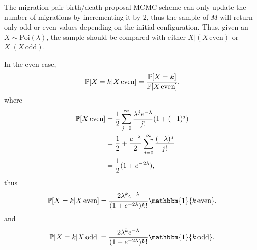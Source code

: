 The migration pair birth/death proposal MCMC scheme can only update the number of migrations by incrementing it by 2, thus the sample of $M$ will return only odd or even values depending on the initial configuration. Thus, given an $X \sim \text{Poi}(\lambda)$, the sample should be compared with either $X | (X \, \text{even})$ or $X | (X \, \text{odd} )$.

In the even case,
\[
\mathbb{P} [X = k | X \, \text{even}] = \frac{\mathbb{P}[X = k]}{\mathbb{P}[X \, \text{even}]},
\]
where
\begin{align*}
	\mathbb{P}[X \, \text{even}] & = \frac{1}{2} \sum_{j=0}^\infty \frac{\lambda^{j} e^{-\lambda}}{j!} (1 + (-1)^j) \\
	& = \frac{1}{2} + \frac{e^{-\lambda}}{2} \sum_{j=0}^\infty \frac{(-\lambda)^j}{j!} \\
	& = \frac{1}{2}(1 + e^{-2 \lambda}),
\end{align*}
thus
\[
\bbP [X = k | X \, \text{even}] = \frac{2\lambda^k e^{-\lambda}}{(1 + e^{-2 \lambda}) k!} \mathbbm{1} \{k \, \text{even} \},
\]
and
\[
\bbP [X = k | X \, \text{odd}] = \frac{2\lambda^k e^{-\lambda}}{(1 - e^{-2 \lambda}) k!} \mathbbm{1} \{k \, \text{odd} \}.
\]